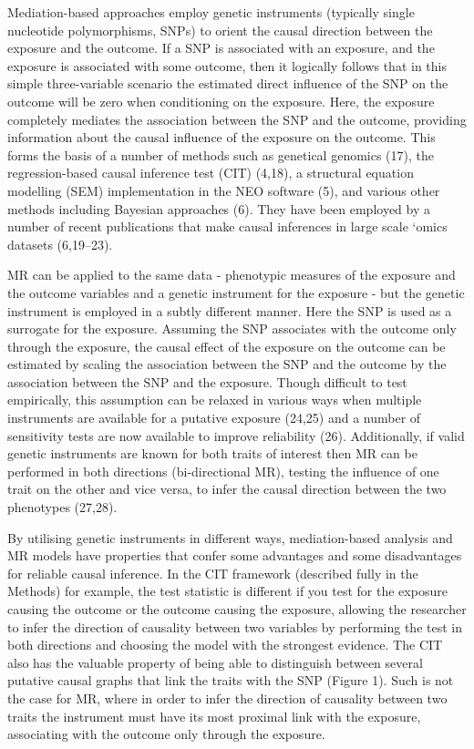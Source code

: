 \documentclass[]{article}
\begin{document}
Mediation-based approaches employ genetic instruments (typically single
nucleotide polymorphisms, SNPs) to orient the causal direction between
the exposure and the outcome. If a SNP is associated with an exposure,
and the exposure is associated with some outcome, then it logically
follows that in this simple three-variable scenario the estimated direct
influence of the SNP on the outcome will be zero when conditioning on
the exposure. Here, the exposure completely mediates the association
between the SNP and the outcome, providing information about the causal
influence of the exposure on the outcome. This forms the basis of a
number of methods such as genetical genomics (17), the regression-based
causal inference test (CIT) (4,18), a structural equation modelling
(SEM) implementation in the NEO software (5), and various other methods
including Bayesian approaches (6). They have been employed by a number
of recent publications that make causal inferences in large scale `omics
datasets (6,19--23).

MR can be applied to the same data - phenotypic measures of the exposure
and the outcome variables and a genetic instrument for the exposure -
but the genetic instrument is employed in a subtly different manner.
Here the SNP is used as a surrogate for the exposure. Assuming the SNP
associates with the outcome only through the exposure, the causal effect
of the exposure on the outcome can be estimated by scaling the
association between the SNP and the outcome by the association between
the SNP and the exposure. Though difficult to test empirically, this
assumption can be relaxed in various ways when multiple instruments are
available for a putative exposure (24,25) and a number of sensitivity
tests are now available to improve reliability (26). Additionally, if
valid genetic instruments are known for both traits of interest then MR
can be performed in both directions (bi-directional MR), testing the
influence of one trait on the other and vice versa, to infer the causal
direction between the two phenotypes (27,28).

By utilising genetic instruments in different ways, mediation-based
analysis and MR models have properties that confer some advantages and
some disadvantages for reliable causal inference. In the CIT framework
(described fully in the Methods) for example, the test statistic is
different if you test for the exposure causing the outcome or the
outcome causing the exposure, allowing the researcher to infer the
direction of causality between two variables by performing the test in
both directions and choosing the model with the strongest evidence. The
CIT also has the valuable property of being able to distinguish between
several putative causal graphs that link the traits with the SNP (Figure
1). Such is not the case for MR, where in order to infer the direction
of causality between two traits the instrument must have its most
proximal link with the exposure, associating with the outcome only
through the exposure.
\end{document}
